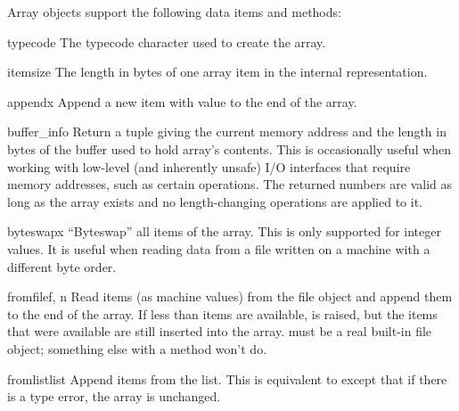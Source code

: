 Array objects support the following data items and methods:

\begin{memberdesc}[array]{typecode}
The typecode character used to create the array.
\end{memberdesc}

\begin{memberdesc}[array]{itemsize}
The length in bytes of one array item in the internal representation.
\end{memberdesc}


\begin{methoddesc}[array]{append}{x}
Append a new item with value  to the end of the array.
\end{methoddesc}

\begin{methoddesc}[array]{buffer_info}{}
Return a tuple  giving the current
memory address and the length in bytes of the buffer used to hold
array's contents.  This is occasionally useful when working with
low-level (and inherently unsafe) I/O interfaces that require memory
addresses, such as certain  operations.  The returned
numbers are valid as long as the array exists and no length-changing
operations are applied to it.
\end{methoddesc}

\begin{methoddesc}[array]{byteswap}{x}
``Byteswap'' all items of the array.  This is only supported for
integer values.  It is useful when reading data from a file written
on a machine with a different byte order.
\end{methoddesc}

\begin{methoddesc}[array]{fromfile}{f, n}
Read  items (as machine values) from the file object 
and append them to the end of the array.  If less than  items
are available,  is raised, but the items that were
available are still inserted into the array.   must be a real
built-in file object; something else with a  method won't
do.
\end{methoddesc}

\begin{methoddesc}[array]{fromlist}{list}
Append items from the list.  This is equivalent to
except that if there is a type error, the array is unchanged.
\end{methoddesc}

